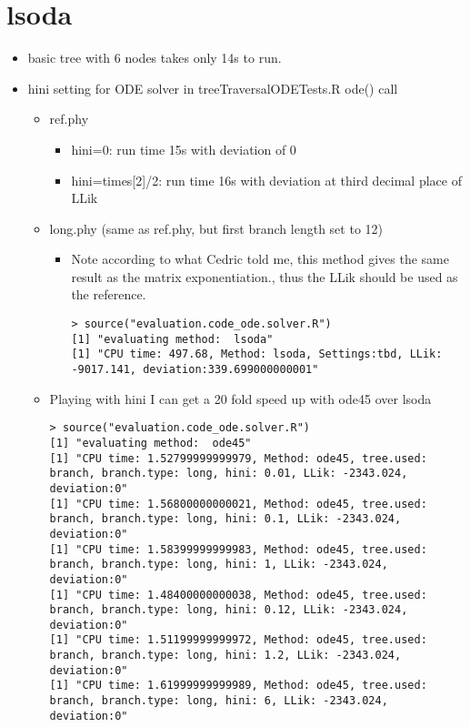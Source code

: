 \documentclass{article}
\begin{document}
\section*{lsoda}
\begin{itemize}
\item basic tree with 6 nodes takes only 14s to run.
\item hini setting for ODE solver in treeTraversalODETests.R ode() call
  \begin{itemize}
  \item ref.phy
    \begin{itemize}
    \item hini=0: run time 15s with deviation of 0
    \item hini=times[2]/2: run time 16s with deviation at third decimal place of LLik
    \end{itemize}
  \item long.phy (same as ref.phy, but first branch length set to 12)
    \begin{itemize}
    \item Note according to what Cedric told me, this method gives the same result as the matrix exponentiation., thus the LLik should be used as the reference.
      \begin{verbatim}
> source("evaluation.code_ode.solver.R")
[1] "evaluating method:  lsoda"
[1] "CPU time: 497.68, Method: lsoda, Settings:tbd, LLik: -9017.141, deviation:339.699000000001"
      \end{verbatim}
    \end{itemize}
  \item Playing with hini I can get a 20 fold speed up with ode45 over lsoda
\begin{verbatim}
> source("evaluation.code_ode.solver.R")
[1] "evaluating method:  ode45"
[1] "CPU time: 1.52799999999979, Method: ode45, tree.used: branch, branch.type: long, hini: 0.01, LLik: -2343.024, deviation:0"
[1] "CPU time: 1.56800000000021, Method: ode45, tree.used: branch, branch.type: long, hini: 0.1, LLik: -2343.024, deviation:0"
[1] "CPU time: 1.58399999999983, Method: ode45, tree.used: branch, branch.type: long, hini: 1, LLik: -2343.024, deviation:0"
[1] "CPU time: 1.48400000000038, Method: ode45, tree.used: branch, branch.type: long, hini: 0.12, LLik: -2343.024, deviation:0"
[1] "CPU time: 1.51199999999972, Method: ode45, tree.used: branch, branch.type: long, hini: 1.2, LLik: -2343.024, deviation:0"
[1] "CPU time: 1.61999999999989, Method: ode45, tree.used: branch, branch.type: long, hini: 6, LLik: -2343.024, deviation:0"

\end{verbatim}
\end{itemize}
\end{itemize}
\end{document}
